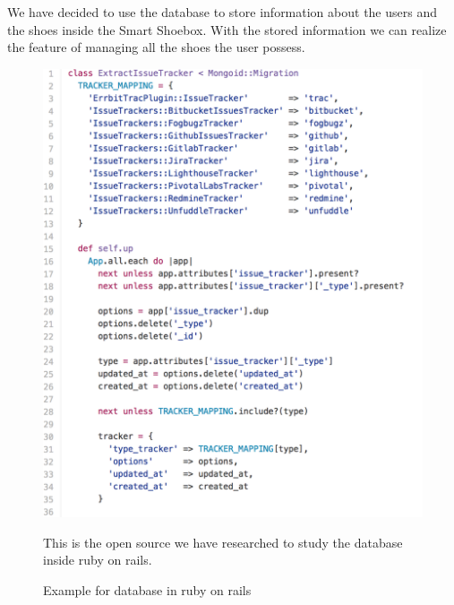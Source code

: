 \documentclass[conference]{IEEEtran}
\begin{document}
We have decided to use the database to store information about the users and the shoes inside the Smart Shoebox. With the stored information we can realize the feature of managing all the shoes the user possess.
\begin{figure}[H]
\begin{center}
    \includegraphics[scale=0.55]{database}
    \caption{Example for database in ruby on rails}\label{fig:label}
    This is the open source we have researched to study the database inside ruby on rails.
\end{center}
\end{figure}
\end{document}
